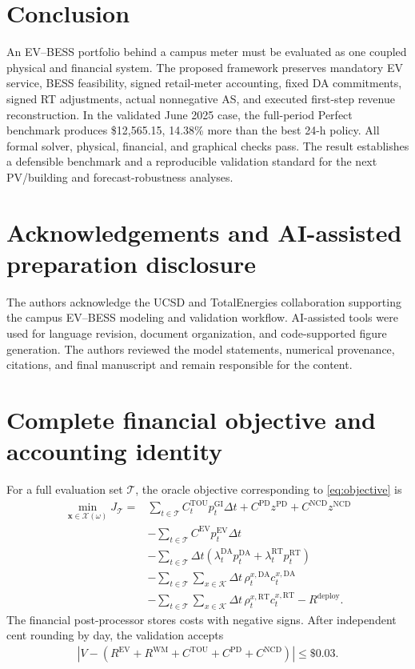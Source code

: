 \documentclass[final,5p,times]{elsarticle}
\newcommand{\dt}{\Delta t}
\newcommand{\EV}{\mathrm{EV}}
\newcommand{\DA}{\mathrm{DA}}
\newcommand{\RT}{\mathrm{RT}}
\newcommand{\GI}{\mathrm{GI}}
\newcommand{\TOU}{\mathrm{TOU}}
\newcommand{\PD}{\mathrm{PD}}
\newcommand{\NCD}{\mathrm{NCD}}
\newcommand{\WM}{\mathrm{WM}}
\newcommand{\calT}{\mathcal{T}}
\newcommand{\calK}{\mathcal{K}}
\begin{document}
\section{Conclusion}
\label{sec:conclusion}

An EV--BESS portfolio behind a campus meter must be evaluated as one coupled
physical and financial system. The proposed framework preserves mandatory EV
service, BESS feasibility, signed retail-meter accounting, fixed DA
commitments, signed RT adjustments, actual nonnegative AS, and executed
first-step revenue reconstruction. In the validated June 2025 case, the
full-period Perfect benchmark produces \$12,565.15, 14.38\% more than the best
24-h policy. All formal solver, physical, financial, and graphical checks pass.
The result establishes a defensible benchmark and a reproducible validation
standard for the next PV/building and forecast-robustness analyses.

\section*{Acknowledgements and AI-assisted preparation disclosure}
The authors acknowledge the UCSD and TotalEnergies collaboration supporting the
campus EV--BESS modeling and validation workflow. AI-assisted tools were used
for language revision, document organization, and code-supported figure
generation. The authors reviewed the model statements, numerical provenance,
citations, and final manuscript and remain responsible for the content.

\appendix

\section{Complete financial objective and accounting identity}
\label{app:objective}

For a full evaluation set $\calT$, the oracle objective corresponding to
\eqref{eq:objective} is
\begin{align}
\min_{\boldsymbol{x}\in\mathcal{X}(\omega)}
J_{\calT}
={}&\sum_{t\in\calT} C_t^{\TOU}p_t^{\GI}\dt
+C^{\PD}z^{\PD}+C^{\NCD}z^{\NCD}\nonumber\\
&-\sum_{t\in\calT}C^{\EV}p_t^{\EV}\dt\nonumber\\
&-\sum_{t\in\calT}\dt
\left(\lambda_t^{\DA}p_t^{\DA}
+\lambda_t^{\RT}p_t^{\RT}\right)\nonumber\\
&-\sum_{t\in\calT}\sum_{x\in\calK}
\dt\,\rho_t^{x,\DA}c_t^{x,\DA}\nonumber\\
&-\sum_{t\in\calT}\sum_{x\in\calK}
\dt\,\rho_t^{x,\RT}c_t^{x,\RT}
-R^{\mathrm{deploy}}. \label{eq:full_objective}
\end{align}
The financial post-processor stores costs with negative signs. After independent
cent rounding by day, the validation accepts
\begin{align}
\left|V-(R^{\EV}+R^{\WM}+C^{\TOU}+C^{\PD}+C^{\NCD})\right|
\le \$0.03. \label{eq:rounding}
\end{align}
\end{document}
